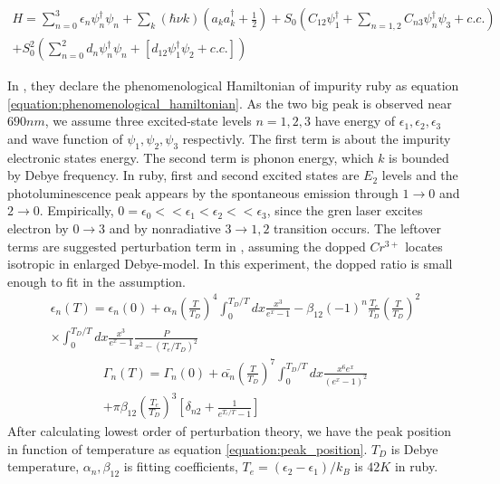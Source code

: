 \documentclass{article}
\begin{document}
 \begin{multline}
  H= \sum_{n=0}^3 \epsilon_n \psi_n^\dagger \psi_n + \sum_k (\hbar \nu k) (a_k a_k^\dagger + \frac{1}{2}) + S_0 (C_{12} \psi_1^\dagger + \sum_{n=1,2} C_{n3} \psi_n^\dagger \psi_3 + c.c.) \\
   + S_0^2 (\sum_{n=0}^2 d_n \psi_n^\dagger \psi_n + [d_{12}\psi_1^\dagger \psi_2 + c.c.])
  \label{equation:phenomenological_hamiltonian}
 \end{multline}

 In \cite{Ruby_temp_theoretical}, they declare the phenomenological Hamiltonian of impurity ruby as equation \ref{equation:phenomenological_hamiltonian}.
 As the two big peak is observed near $690nm$, we assume three excited-state levels $n=1,2,3$ have energy of $\epsilon_1, \epsilon_2, \epsilon_3$ and wave function of $\psi_1, \psi_2, \psi_3$ respectivly.
 The first term is about the impurity electronic states energy.
 The second term is phonon energy, which $k$ is bounded by Debye frequency.
 In ruby, first and second excited states are $E_2$ levels and the photoluminescence peak appears by the spontaneous emission through $1\rightarrow0$ and $2\rightarrow0$.
 Empirically, $0=\epsilon_0<<\epsilon_1 < \epsilon_2 << \epsilon_3$, since the gren laser excites electron by $0\rightarrow3$ and by nonradiative $3\rightarrow1,2$ transition occurs.
 The leftover terms are suggested perturbation term in \cite{Ruby_temp_theoretical}, assuming the dopped $Cr^{3+}$ locates isotropic in enlarged Debye-model.
 In this experiment, the dopped ratio is small enough to fit in the assumption.
 \begin{multline}
  \epsilon_n (T) = \epsilon_n (0) + \alpha_n (\frac{T}{T_D})^4 \int_{0}^{T_D / T} dx \frac{x^3}{e^x -1} - \beta_{12} (-1)^n \frac{T_e}{T_D} (\frac{T}{T_D})^2 \\
  \times \int^{T_D/T}_{0} dx \frac{x^3}{e^x -1} \frac{P}{x^2 - (T_e/T_D)^2}
  \label{equation:peak_position}
 \end{multline}
 \begin{multline}
  \Gamma_n(T) = \Gamma_n(0) + \bar{\alpha_n} (\frac{T}{T_D})^7 \int^{T_D/T}_{0} dx \frac{x^6 e^x}{(e^x -1)^2}\\ + \pi \beta_{12} (\frac{T_e}{T_D})^3 [\delta_{n2}+\frac{1}{e^{T_e/T}-1}]
  \label{equation:peak_width}
 \end{multline}
 After calculating lowest order of perturbation theory, we have the peak position in function of temperature as equation \ref{equation:peak_position}.
 $T_D$ is Debye temperature, $\alpha_n , \beta_{12}$ is fitting coefficients, $T_e=(\epsilon_2 - \epsilon_1)/k_B$ is $42K$ in ruby.
\end{document}

